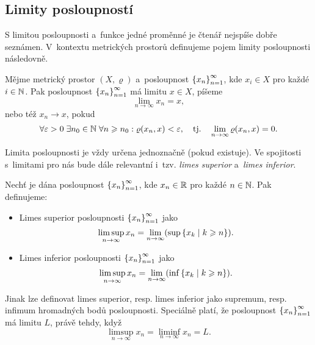 \subsection{Limity posloupností}\label{subsec:limity-posl-mp}

S limitou posloupnosti a~funkce jedné proměnné je čtenář nejspíše dobře seznámen. V~kontextu metrických prostorů definujeme pojem limity posloupnosti následovně.
\begin{definition}\label{def:limita-mp}
    Mějme metrický prostor $(X,\varrho)$ a~posloupnost $\left\{x_n\right\}_{n=1}^\infty$, kde $x_i\in X$ pro každé $i\in\mathbb{N}$. Pak posloupnost $\left\{x_n\right\}_{n=1}^\infty$ má limitu $x\in X$, píšeme
    \[\lim_{n\to\infty}x_n=x,\]
    nebo též $x_n\to x$, pokud
    \[\forall\varepsilon>0\;\exists n_0\in\mathbb{N}\;\forall n\geqslant n_0: \varrho(x_n,x)<\varepsilon,\quad\text{tj.}\quad\lim_{n\to\infty}\varrho(x_n,x)=0.\]
\end{definition}
Limita posloupnosti je vždy určena jednoznačně (pokud existuje). Ve spojitosti s~limitami pro nás bude dále relevantní i~tzv. \emph{limes superior} a~\emph{limes inferior}.
\begin{definition}\label{def:limsup-liminf-mp}
    Nechť je dána posloupnost $\left\{x_n\right\}_{n=1}^\infty$, kde $x_n\in\mathbb{R}$ pro každé $n\in\mathbb{N}$. Pak definujeme:
    \begin{itemize}
        \item Limes superior posloupnosti $\left\{x_n\right\}_{n=1}^\infty$ jako
        \[\limsup_{n\to\infty}x_n=\lim_{n\to\infty}(\sup\left\{x_k\mid k\geqslant n\right\}).\]
        \item Limes inferior posloupnosti $\left\{x_n\right\}_{n=1}^\infty$ jako
        \[\limsup_{n\to\infty}x_n=\lim_{n\to\infty}(\inf\left\{x_k\mid k\geqslant n\right\}).\]
    \end{itemize}
\end{definition}
Jinak lze definovat limes superior, resp. limes inferior jako supremum, resp. infimum hromadných bodů posloupnosti. Speciálně platí, že posloupnost $\left\{x_n\right\}_{n=1}^\infty$ má limitu $L$, právě tehdy, když
\[\limsup_{n\to\infty}x_n=\liminf_{n\to\infty}x_n=L.\]

